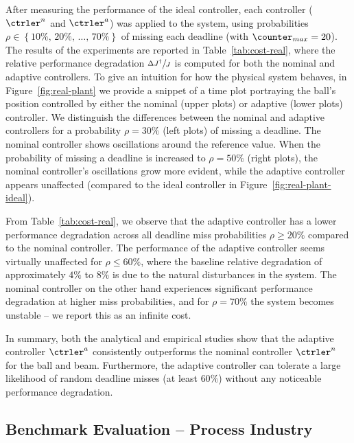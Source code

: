 After measuring the performance of the ideal controller, each controller ($\ctrler^n$ and $\ctrler^a$) was applied to the system, using probabilities $\rho \in \left\{ 10\%,\, 20\%,\, \ldots,\, 70\% \right\}$ of missing each deadline (with $\counter_{max} = 20$).
The results of the experiments are reported in Table~\ref{tab:cost-real}, where the relative performance degradation $\sfrac{\Delta J^\dagger}{J}$ is computed for both the nominal and adaptive controllers.
To give an intuition for how the physical system behaves, in Figure~\ref{fig:real-plant} we provide a snippet of a time plot portraying the ball's position controlled by either the nominal (upper plots) or adaptive (lower plots) controller.
We distinguish the differences between the nominal and adaptive controllers for a probability $\rho = 30\%$ (left plots) of missing a deadline.
The nominal controller shows oscillations around the reference value.
When the probability of missing a deadline is increased to $\rho = 50\%$ (right plots), the nominal controller's oscillations grow more evident, while the adaptive controller appears unaffected (compared to the ideal controller in Figure~\ref{fig:real-plant-ideal}).

From Table~\ref{tab:cost-real}, we observe that the adaptive controller has a lower performance degradation across all deadline miss probabilities $\rho \geq 20\%$ compared to the nominal controller.
The performance of the adaptive controller seems virtually unaffected for $\rho \leq 60\%$, where the baseline relative degradation of approximately  $4\%$ to $8\%$ is due to the natural disturbances in the system.
The nominal controller on the other hand experiences significant performance degradation at higher miss probabilities, and for $\rho = 70\%$ the system becomes unstable -- we report this as an infinite cost.

In summary, both the analytical and empirical studies show that the adaptive controller $\ctrler^a$ consistently outperforms the nominal controller $\ctrler^n$ for the ball and beam. Furthermore, the adaptive controller can tolerate
a large likelihood of random deadline misses (at least $60\%$) without any noticeable performance degradation.

\subsection{Benchmark Evaluation -- Process Industry}
\label{sec:aggregate}
%

